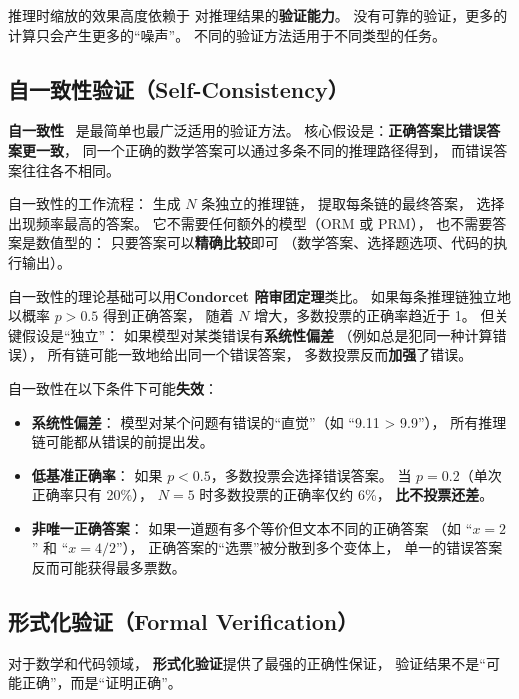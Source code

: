 推理时缩放的效果高度依赖于
对推理结果的\textbf{验证能力}。
没有可靠的验证，更多的计算只会产生更多的“噪声”。
不同的验证方法适用于不同类型的任务。

\subsection{自一致性验证（Self-Consistency）}

\textbf{自一致性}~\cite{wang2023selfconsistency}
是最简单也最广泛适用的验证方法。
核心假设是：\textbf{正确答案比错误答案更一致}，
同一个正确的数学答案可以通过多条不同的推理路径得到，
而错误答案往往各不相同。

自一致性的工作流程：
生成 $N$ 条独立的推理链，
提取每条链的最终答案，
选择出现频率最高的答案。
它不需要任何额外的模型（ORM 或 PRM），
也不需要答案是数值型的：
只要答案可以\textbf{精确比较}即可
（数学答案、选择题选项、代码的执行输出）。

自一致性的理论基础可以用\textbf{Condorcet 陪审团定理}类比。
如果每条推理链独立地以概率 $p > 0.5$ 得到正确答案，
随着 $N$ 增大，多数投票的正确率趋近于 1。
但关键假设是“独立”：
如果模型对某类错误有\textbf{系统性偏差}
（例如总是犯同一种计算错误），
所有链可能一致地给出同一个错误答案，
多数投票反而\textbf{加强}了错误。

\begin{warnbox}[自一致性的隐含假设]
自一致性在以下条件下可能\textbf{失效}：
\begin{itemize}[noitemsep]
  \item \textbf{系统性偏差}：
        模型对某个问题有错误的“直觉”（如 “9.11 > 9.9”），
        所有推理链可能都从错误的前提出发。
  \item \textbf{低基准正确率}：
        如果 $p < 0.5$，多数投票会选择错误答案。
        当 $p = 0.2$（单次正确率只有 20\%），
        $N = 5$ 时多数投票的正确率仅约 6\%，
        \textbf{比不投票还差}。
  \item \textbf{非唯一正确答案}：
        如果一道题有多个等价但文本不同的正确答案
        （如 “$x = 2$” 和 “$x = 4/2$”），
        正确答案的“选票”被分散到多个变体上，
        单一的错误答案反而可能获得最多票数。
\end{itemize}
\end{warnbox}

\subsection{形式化验证（Formal Verification）}

对于数学和代码领域，
\textbf{形式化验证}提供了最强的正确性保证，
验证结果不是“可能正确”，而是“证明正确”。


